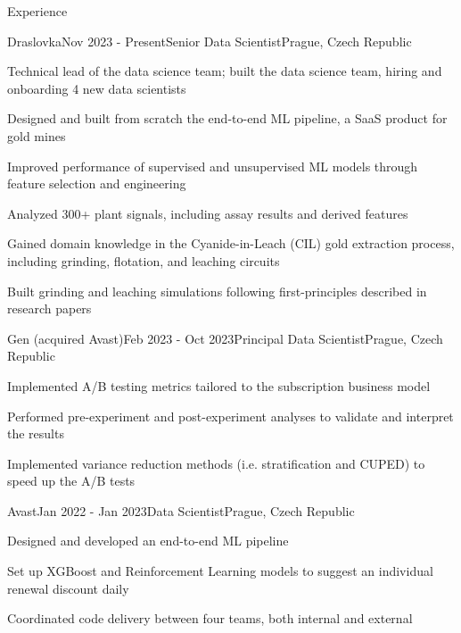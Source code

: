 \documentclass[
	11pt, %
]{resume} %
\begin{document}

\begin{rSection}{Experience}

	\begin{rSubsection}{Draslovka}{Nov 2023 - Present}{Senior Data Scientist}{Prague, Czech Republic}
        \item Technical lead of the data science team; built the data science team, hiring and onboarding 4 new data scientists
        \item Designed and built from scratch the end-to-end ML pipeline, a SaaS product for gold mines
        \item Improved performance of supervised and unsupervised ML models through feature selection and engineering
        \item Analyzed 300+ plant signals, including assay results and derived features
        \item Gained domain knowledge in the Cyanide-in-Leach (CIL) gold extraction process, including grinding, flotation, and leaching circuits
        \item Built grinding and leaching simulations following first-principles described in research papers
	\end{rSubsection}


	\begin{rSubsection}{Gen (acquired Avast)}{Feb 2023 - Oct 2023}{Principal Data Scientist}{Prague, Czech Republic}
        \item Implemented A/B testing metrics tailored to the subscription business model
        \item Performed pre-experiment and post-experiment analyses to validate and interpret the results
        \item Implemented variance reduction methods (i.e. stratification and CUPED) to speed up the A/B tests
	\end{rSubsection}


	\begin{rSubsection}{Avast}{Jan 2022 - Jan 2023}{Data Scientist}{Prague, Czech Republic}
		\item Designed and developed an end-to-end ML pipeline
		\item Set up XGBoost and Reinforcement Learning models to suggest an individual renewal discount daily
		\item Coordinated code delivery between four teams, both internal and external
	\end{rSubsection}
	

\end{rSection}
\end{document}

